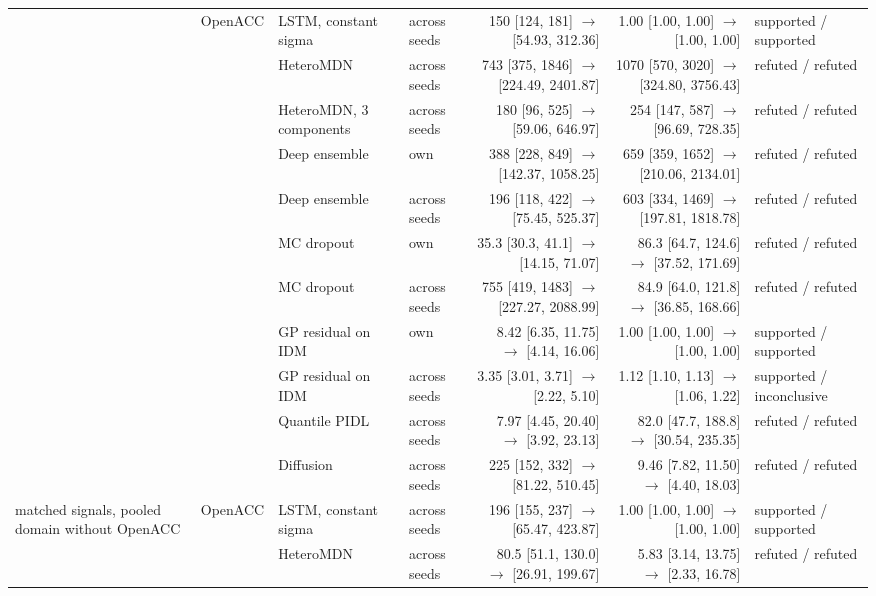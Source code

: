 \begin{longtable}{llllrrl}
\midrule
 & OpenACC & LSTM, constant sigma & across seeds & 150 [124, 181] $\rightarrow$ [54.93, 312.36] & 1.00 [1.00, 1.00] $\rightarrow$ [1.00, 1.00] & supported / supported \\
 &  & HeteroMDN & across seeds & 743 [375, 1846] $\rightarrow$ [224.49, 2401.87] & 1070 [570, 3020] $\rightarrow$ [324.80, 3756.43] & refuted / refuted \\
 &  & HeteroMDN, 3 components & across seeds & 180 [96, 525] $\rightarrow$ [59.06, 646.97] & 254 [147, 587] $\rightarrow$ [96.69, 728.35] & refuted / refuted \\
 &  & Deep ensemble & own & 388 [228, 849] $\rightarrow$ [142.37, 1058.25] & 659 [359, 1652] $\rightarrow$ [210.06, 2134.01] & refuted / refuted \\
 &  & Deep ensemble & across seeds & 196 [118, 422] $\rightarrow$ [75.45, 525.37] & 603 [334, 1469] $\rightarrow$ [197.81, 1818.78] & refuted / refuted \\
 &  & MC dropout & own & 35.3 [30.3, 41.1] $\rightarrow$ [14.15, 71.07] & 86.3 [64.7, 124.6] $\rightarrow$ [37.52, 171.69] & refuted / refuted \\
 &  & MC dropout & across seeds & 755 [419, 1483] $\rightarrow$ [227.27, 2088.99] & 84.9 [64.0, 121.8] $\rightarrow$ [36.85, 168.66] & refuted / refuted \\
 &  & GP residual on IDM & own & 8.42 [6.35, 11.75] $\rightarrow$ [4.14, 16.06] & 1.00 [1.00, 1.00] $\rightarrow$ [1.00, 1.00] & supported / supported \\
 &  & GP residual on IDM & across seeds & 3.35 [3.01, 3.71] $\rightarrow$ [2.22, 5.10] & 1.12 [1.10, 1.13] $\rightarrow$ [1.06, 1.22] & supported / inconclusive \\
 &  & Quantile PIDL & across seeds & 7.97 [4.45, 20.40] $\rightarrow$ [3.92, 23.13] & 82.0 [47.7, 188.8] $\rightarrow$ [30.54, 235.35] & refuted / refuted \\
 &  & Diffusion & across seeds & 225 [152, 332] $\rightarrow$ [81.22, 510.45] & 9.46 [7.82, 11.50] $\rightarrow$ [4.40, 18.03] & refuted / refuted \\
\midrule
matched signals, pooled domain without OpenACC & OpenACC & LSTM, constant sigma & across seeds & 196 [155, 237] $\rightarrow$ [65.47, 423.87] & 1.00 [1.00, 1.00] $\rightarrow$ [1.00, 1.00] & supported / supported \\
 &  & HeteroMDN & across seeds & 80.5 [51.1, 130.0] $\rightarrow$ [26.91, 199.67] & 5.83 [3.14, 13.75] $\rightarrow$ [2.33, 16.78] & refuted / refuted \\

\end{longtable}
